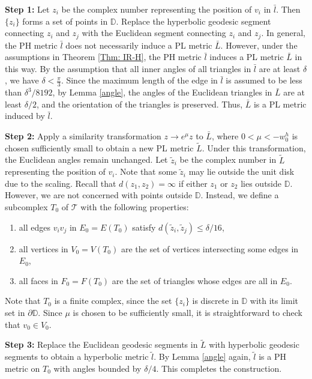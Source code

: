 \documentclass[12pt]{amsart}
\theoremstyle{definition}
\begin{document}
\textbf{Step 1:}
Let $z_i$ be the complex number representing the position of $v_i$ in $\bar{l}$.
Then $\{z_i\}$ forms a set of points in $\mathbb{D}$.
Replace the hyperbolic geodesic segment connecting $z_i$ and $z_j$ with the Euclidean segment connecting $z_i$ and $z_j$.
In general, the PH metric $\bar{l}$ does not necessarily induce a PL metric $\bar{L}$.
However, under the assumptions in Theorem \ref{Thm: IR-H}, the PH metric $\bar{l}$ induces a PL metric $\bar{L}$ in this way.
By the assumption that all inner angles of all triangles in $\bar{l}$ are at least $\delta$, we have $\delta<\frac{\pi}{3}$.
Since the maximum length of the edge in $\bar l$ is assumed to be less than $\delta^3/8192$, by Lemma \ref{angle}, the angles of the Euclidean triangles in $\bar{L}$ are at least $\delta/2$, and the orientation of the triangles is preserved. 
Thus, $\bar{L}$ is a PL metric induced by $\bar{l}$.

\textbf{Step 2:}
Apply a similarity transformation $z\to e^\mu z$ to $\bar L$, where $0<\mu<-w^h_0$ is chosen sufficiently small to obtain a new PL metric $\tilde L$.
Under this transformation, the Euclidean angles remain unchanged.
Let $\tilde z_i$ be the complex number in $\tilde{L}$ representing the position of $v_i$.
Note that some $\tilde z_i$ may lie outside the unit disk due to the scaling.
Recall that $d(z_1,z_2)=\infty$ if either $z_1$ or $z_2$ lies outside $\mathbb{D}$.
However, we are not concerned with points outside $\mathbb{D}$.
Instead, we define a subcomplex $T_0$ of $\mathcal{T}$ with the following properties:
\begin{enumerate}
\item[(1)] all edges $v_iv_j$ in $E_0=E(T_0)$ satisfy $d(\tilde z_i, \tilde z_j)\leq \delta/16$,
\item[(2)] all vertices in $V_0=V(T_0)$ are the set of vertices intersecting some edges in $E_0$,
\item[(3)] all faces in $F_0=F(T_0)$ are the set of triangles whose edges are all in $E_0$.
\end{enumerate}
Note that $T_0$ is a finite complex, since the set $\{z_i\}$ is discrete in $\mathbb{D}$ with its limit set in $\partial \mathbb{D}$. Since $\mu$ is chosen to be sufficiently small,  it is straightforward to check that $v_0\in V_0$. 

\textbf{Step 3:}
Replace the Euclidean geodesic segments in $\tilde{L}$ with hyperbolic geodesic segments to obtain a hyperbolic metric $\tilde l$.
By Lemma \ref{angle} again, $\tilde l$ is a PH metric on $T_0$ with angles bounded by $\delta/4$.
This completes the construction.
\end{document}
